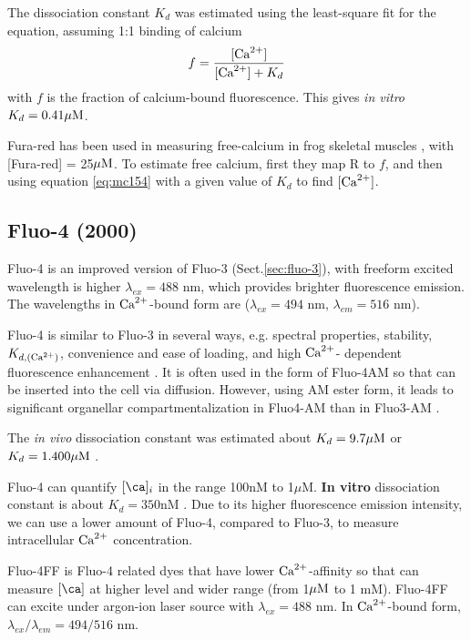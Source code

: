 The dissociation constant $K_d$ was estimated using the least-square fit for the
equation, assuming 1:1 binding of calcium
\begin{equation}
\label{eq:mc154}
f = \frac{[{\text{Ca}^{2+}}]}{[{\text{Ca}^{2+}}]+K_d}
\end{equation}
with $f$ is the fraction of calcium-bound fluorescence. This gives {\it in
vitro} $K_d = 0.41{\mu\text{M}}$.

Fura-red has been used in measuring free-calcium in frog skeletal muscles
\citep{kurebayashi1993}, with [Fura-red] = 25${\mu\text{M}}$.
To estimate free calcium, first they map R to $f$, and then using equation
\ref{eq:mc154} with a given value of $K_d$ to find $[{\text{Ca}^{2+}}]$.


\subsection{Fluo-4 (2000)}
\label{sec:fluo-4}

Fluo-4 is an improved version of Fluo-3 (Sect.\ref{sec:fluo-3}), with
freeform excited wavelength is higher $\lambda_{ex}= 488$ nm, which provides
brighter fluorescence emission.
The wavelengths in ${\text{Ca}^{2+}}$-bound form are ($\lambda_{ex}=494$ nm,
$\lambda_{em}=516$ nm).

Fluo-4 is similar to Fluo-3 in several ways, e.g. spectral properties,
stability, $K_{d,({\text{Ca}^{2+}})}$, convenience and ease of loading, and high ${\text{Ca}^{2+}}$-
dependent fluorescence enhancement \citep{gee2000}.
It is often used in the form of Fluo-4AM so that can be inserted into the cell
via diffusion. However, using AM ester form, it leads to significant organellar
compartmentalization in Fluo4-AM than in Fluo3-AM \citep{hagen2012}.

The {\it in vivo} dissociation constant was estimated about $K_d=9.7 {\mu\text{M}}$
\citep{} or $K_d = 1.400{\mu\text{M}}$ \citep{hagen2012}.


Fluo-4 can quantify $[\ca]_i$ in the range 100nM to 1$\mu$M.
{\bf In vitro} dissociation constant is about $K_d=350$nM \citep{hagen2012}. Due
to its higher fluorescence emission intensity, we can use a lower amount of
Fluo-4, compared to Fluo-3, to measure intracellular ${\text{Ca}^{2+}}$ concentration.

\begin{framed}
Fluo-4FF is Fluo-4 related dyes that have lower ${\text{Ca}^{2+}}$-affinity so
that can measure $[\ca]$ at higher level and wider range (from 1${\mu\text{M}}$ to 1 mM).
Fluo-4FF can excite under argon-ion laser source with $\lambda_{ex}=488$ nm. In
${\text{Ca}^{2+}}$-bound  form, $\lambda_{ex}/\lambda_{em}=494/516$ nm.
\end{framed}


